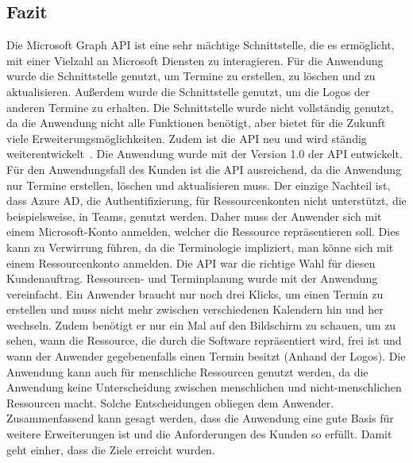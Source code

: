 \subsection{Fazit}\label{subsec:fazit}
Die Microsoft Graph API ist eine sehr mächtige Schnittstelle, die es ermöglicht, mit einer Vielzahl an Microsoft Diensten zu interagieren.
Für die Anwendung wurde die Schnittstelle genutzt, um Termine zu erstellen, zu löschen und zu aktualisieren.
Außerdem wurde die Schnittstelle genutzt, um die Logos der anderen Termine zu erhalten.
Die Schnittstelle wurde nicht vollständig genutzt, da die Anwendung nicht alle Funktionen benötigt, aber bietet für die Zukunft viele Erweiterungsmöglichkeiten.
Zudem ist die API neu und wird ständig weiterentwickelt~\cite{microsoft-graph-api-version}.
Die Anwendung wurde mit der Version 1.0 der API entwickelt.
Für den Anwendungsfall des Kunden ist die API ausreichend, da die Anwendung nur Termine erstellen, löschen und aktualisieren muss.
Der einzige Nachteil ist, dass Azure AD, die Authentifizierung, für Ressourcenkonten nicht unterstützt, die beispielsweise, in Teams, genutzt werden.
Daher muss der Anwender sich mit einem Microsoft-Konto anmelden, welcher die Ressource repräsentieren soll.
Dies kann zu Verwirrung führen, da die Terminologie impliziert, man könne sich mit einem Ressourcenkonto anmelden.
\newline
\newline
Die API war die richtige Wahl für diesen Kundenauftrag.
Ressourcen- und Terminplanung wurde mit der Anwendung vereinfacht.
Ein Anwender braucht nur noch drei Klicks, um einen Termin zu erstellen und muss nicht mehr zwischen verschiedenen Kalendern hin und her wechseln.
Zudem benötigt er nur ein Mal auf den Bildschirm zu schauen, um zu sehen, wann die Ressource, die durch die Software repräsentiert wird, frei ist und wann der Anwender gegebenenfalls einen Termin besitzt (Anhand der Logos).
\newline
\newline
Die Anwendung kann auch für menschliche Ressourcen genutzt werden, da die Anwendung keine Unterscheidung zwischen menschlichen und nicht-menschlichen Ressourcen macht.
Solche Entscheidungen obliegen dem Anwender.
\newline
\newline
Zusammenfassend kann gesagt werden, dass die Anwendung eine gute Basis für weitere Erweiterungen ist und die Anforderungen des Kunden so erfüllt.
Damit geht einher, dass die Ziele erreicht wurden.
\pagebreak
\newline
